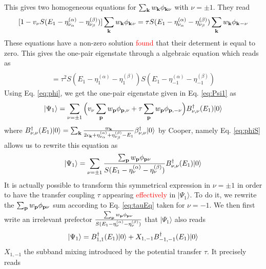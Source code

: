 \documentclass[11pt]{article} %
\newcommand{\ns}[1]{\textcolor{red}{#1}}
\begin{document}
This gives two homogeneous equations for $\sum_{\mathbf{k}}w_{\mathbf{k}}\phi_{\mathbf{k}\nu}$ with $\nu=\pm1$. They read
\begin{equation}\label{eq:tauEq}
[1-v_{\nu}S(E_1-\eta_{\nu_{\alpha}}^{(\alpha)}-\eta_{\nu_{\beta}}^{(\beta)})]\sum_{\mathbf{k}}w_{\mathbf{k}}\phi_{\mathbf{k}^{}\nu}
=\tau{}S(E_1-\eta_{\nu_{\alpha}}^{(\alpha)}-\eta_{\nu_{\beta}}^{(\beta)})\sum_{\mathbf{k}}w_{\mathbf{k}}\phi_{\mathbf{k}^{}-\nu}
\end{equation}
These equations have a non-zero solution \ns{found} that their determent is equal to zero.  This gives the one-pair eigenstate through a algebraic  equation which reads as 
\begin{multline}
[1-v_{1}S(E_1-\eta_{1}^{(\alpha)}-\eta_{1}^{(\beta)})][1-v_{-1}S(E_1-\eta_{-1}^{(\alpha)}-\eta_{-1}^{(\beta)})]\\
=\tau^2S(E_1-\eta_{1}^{(\alpha)}-\eta_{1}^{(\beta)})S(E_1-\eta_{-1}^{(\alpha)}-\eta_{-1}^{(\beta)})
\end{multline}
Using Eq. \ref{eq:phi}, we get the one-pair eigenstate given in Eq. \ref{eq:Psi1} as
\begin{equation}
|\Psi_1\rangle=\sum_{\nu=\pm1}\Big(v_{\nu}\sum_{\mathbf{p}}w_{\mathbf{p}}\phi_{\mathbf{p},\nu}+\tau{}\sum_{\mathbf{p}}w_{\mathbf{p}}\phi_{\mathbf{p},-\nu}\Big)B^{\dagger}_{\nu,\nu}(E_{1})|0\rangle
\end{equation}
where $B^{\dagger}_{\nu,\nu}(E_{1})|0\rangle=\sum_{\mathbf{k}}\frac{w_{\mathbf{k}}}{2\epsilon_{\mathbf{k}}+\eta_{\nu_{\alpha}}^{(\alpha)}+\eta_{\nu_{\beta}}^{(\beta)}-E_1}\beta^{\dagger}_{\nu,\nu}|0\rangle$ by Cooper, namely Eq. \ref{eq:phiS} allows us to rewrite this equation as 
\begin{equation}
|\Psi_1\rangle=\sum_{\nu=\pm1}\frac{\sum_{\mathbf{p}}w_{\mathbf{p}}\phi_{\mathbf{p}\nu}}{S(E_1-\eta_{\nu_{}}^{(\alpha)}-\eta_{\nu_{}}^{(\beta)})}B^{\dagger}_{\nu,\nu}(E_{1})|0\rangle
\end{equation}
It is actually possible to transform this symmetrical expression in $\nu=\pm1$ in order to have the transfer coupling $\tau$ appearing \ns{effectively} in $|\Psi_1\rangle$.  To do it, we rewrite the $\sum_{\mathbf{p}}w_{\mathbf{p}}\phi_{\mathbf{p}\nu}$ sum according to Eq. \ref{eq:tauEq} taken for $\nu=-1$.  We then first write an {irrelevant} prefector $\frac{\sum_{\mathbf{p}}w_{\mathbf{p}}\phi_{\mathbf{p}\nu}}{S(E_1-\eta_{\nu_{}}^{(\alpha)}-\eta_{\nu_{}}^{(\beta)})}$ that $|\Psi_1\rangle$ also reads
\begin{equation}\label{eq:Psi1B}
|\Psi_1\rangle=B^{\dagger}_{1,1}(E_{1})|0\rangle+X_{1,-1}B^{\dagger}_{-1,-1}(E_{1})|0\rangle
\end{equation}
$X_{1,-1}$ the subband mixing introduced by the potential transfer $\tau$.  It precisely reads
\end{document}
